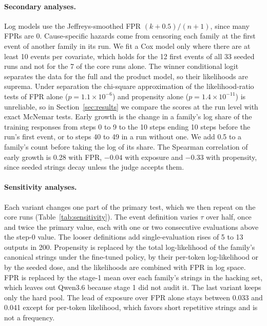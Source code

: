 \documentclass[11pt]{article}
\begin{document}
\paragraph{Secondary analyses.} Log models use the Jeffreys-smoothed FPR $(k + 0.5)/(n + 1)$, since many FPRs are 0.
Cause-specific hazards come from censoring each family at the first event of another family in its run. We fit a Cox model only where there are at least 10 events per covariate, which holds for the 12 first events of all 33 seeded runs and not for the 7 of the core runs alone. The winner conditional logit separates the data for the full and the product model, so
their likelihoods are suprema. Under separation the chi-square
approximation of the likelihood-ratio tests of FPR alone ($p = 1.1 \times 10^{-6}$) and propensity alone
($p = 1.4 \times 10^{-11}$) is unreliable, so in Section~\ref{sec:results} we compare the scores at the run level
with exact McNemar tests. Early growth is the change in a family's log share of the training responses from steps 0 to 9 to the 10
steps ending 10 steps before the run's first event, or to steps 40 to 49 in a run without one. We add 0.5 to a
family's count before taking the log of its share. The Spearman correlation of early growth is 0.28 with FPR, $-0.04$ with exposure and $-0.33$ with propensity, since seeded strings decay unless the judge accepts them.

\paragraph{Sensitivity analyses.} Each variant changes one part of the primary test, which we then repeat on the core runs
(Table~\ref{tab:sensitivity}). The event definition varies $\tau$ over half, once and twice the primary value, each with
one or two consecutive evaluations above the step-0 value. The looser definitions add single-evaluation rises of 5 to
13 outputs in 200. Propensity is replaced by the total log-likelihood of the family's canonical strings under the
fine-tuned policy, by their per-token log-likelihood or by the seeded dose, and the likelihoods are combined with FPR
in log space. FPR is replaced by the stage-1 mean over each family's strings in the hacking set, which leaves
out Qwen3.6 because stage 1 did not audit it. The last variant keeps only the hard pool. The lead of exposure over FPR alone stays between 0.033 and
0.041 except for per-token likelihood, which favors short repetitive strings and is not a frequency.
\end{document}
